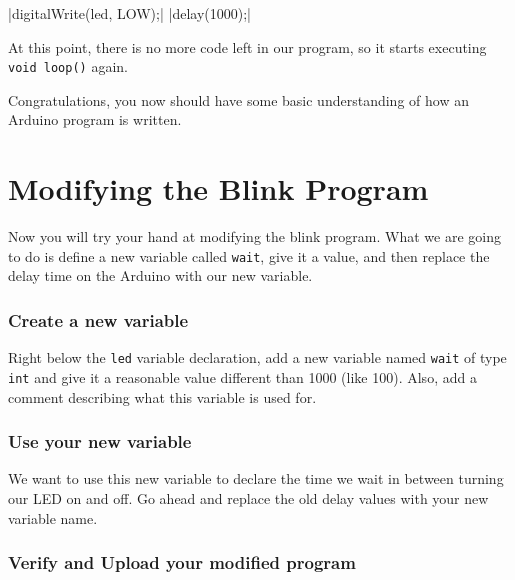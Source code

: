 \documentclass[11pt,a4paper]{article}
\begin{document}
|digitalWrite(led, LOW);|
|delay(1000);|

At this point, there is no more code left in our program, so it starts executing \texttt{void loop()} again.


Congratulations, you now should have some basic understanding of how an Arduino program is written.


\section{Modifying the Blink Program} %
\label{sub:modifying_the_blink_program}

Now you will try your hand at modifying the blink program.  What we are going to do is define a new variable called \texttt{wait}, give it a value, and then replace the delay time on the Arduino with our new variable. 

\subsubsection{Create a new variable} %
\label{ssub:create_a_new_variable}

Right below the \texttt{led} variable declaration, add a new variable named \texttt{wait} of type \texttt{int} and give it a reasonable value different than 1000 (like 100).  Also, add a comment describing what this variable is used for.

\subsubsection{Use your new variable} %
\label{ssub:use_your_new_variable}

We want to use this new variable to declare the time we wait in between turning our LED on and off.  Go ahead and replace the old delay values with your new variable name.  


\subsubsection{Verify and Upload your modified program} %
\label{ssub:verify_and_upload_your_modified_program}
\end{document}
